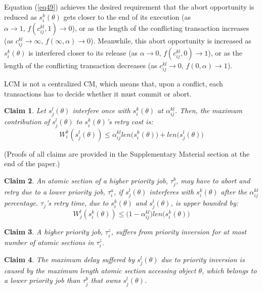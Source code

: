 \documentclass{sig-alternate}
\newtheorem{clm}{Claim}
\begin{document}
Equation (\ref{eq49}) achieves the desired requirement that the abort opportunity is reduced as $s_{i}^{k}(\theta)$ gets
closer to the end of its execution (as $\alpha\rightarrow1,\, f(c_{ij}^{kl},1)\rightarrow0$),
or as the length of the conflicting transaction increases (as $c_{ij}^{kl}\rightarrow\infty,\, f(\infty,\alpha)\rightarrow0$).
Meanwhile, this abort opportunity is increased as $s_{i}^{k}(\theta)$
is interfered closer to its release (as $\alpha\rightarrow0,\, f(c_{ij}^{kl},0)\rightarrow1$),
or as the length of the conflicting transaction decreases (as $c_{ij}^{kl}\rightarrow0,\, f(0,\alpha)\rightarrow1$).

LCM is not a centralized CM, which means that, upon a conflict, each transactions has to decide whether it must commit or abort. 

\begin{clm}
\label{LCM_higher_rc}
Let $s_{j}^{l}(\theta)$ interfere once with $s_{i}^{k}(\theta)$ at $\alpha_{ij}^{kl}$. Then, the maximum contribution of $s_{j}^{l}(\theta)$ to 
$s_{i}^{k}(\theta)$'s 
retry cost is:
\begin{equation}
W_i^k(s_j^l(\theta))\le \alpha_{ij}^{kl}len\Big(s_{i}^{k}(\theta)\Big)+len\Big(s_{j}^{l}(\theta)\Big)\label{eq47}\end{equation}
\end{clm}
(Proofs of all claims are provided in the Supplementary Material section at the end of the paper.)


\begin{clm}
\label{LCM_lower_rc}
An atomic section of a higher priority job, $\tau_{j}^b$, may have to abort and retry due to a lower priority job, $\tau_{i}^a$, if $s_{j}^{l}(\theta)$ interferes
with $s_{i}^{k}(\theta)$ after the $\alpha_{ij}^{kl}$ percentage. $\tau_{j}$'s retry time, due to $s_{i}^{k}(\theta)$ and $s_{j}^{l}(\theta)$,
is upper bounded by:
 \begin{equation}
W_j^l(s_i^k(\theta))\le \Big(1-\alpha_{ij}^{kl}\Big)len\Big(s_{i}^{k}(\theta)\Big)\label{eq48}\end{equation}
\end{clm}

\begin{clm}
\label{priority_inversion}
A higher priority job, $\tau_i^z$, suffers from priority inversion for at most number of atomic sections in $\tau_i^z$.
\end{clm}

\begin{clm}
\label{max_pri_inv}
The maximum delay suffered by $s_j^l(\theta)$ due to priority inversion is caused by the maximum length atomic section accessing object $\theta$, which belongs to a lower priority job than $\tau_j^b$ that owns $s_j^l(\theta)$.
\end{clm}
\end{document}
